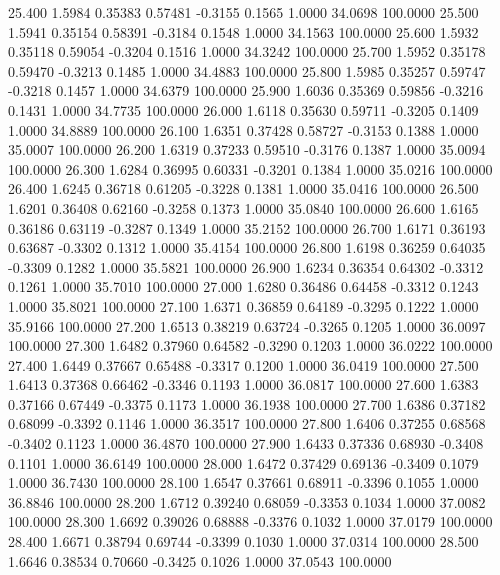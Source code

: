  25.400   1.5984   0.35383   0.57481  -0.3155   0.1565   1.0000  34.0698 100.0000
  25.500   1.5941   0.35154   0.58391  -0.3184   0.1548   1.0000  34.1563 100.0000
  25.600   1.5932   0.35118   0.59054  -0.3204   0.1516   1.0000  34.3242 100.0000
  25.700   1.5952   0.35178   0.59470  -0.3213   0.1485   1.0000  34.4883 100.0000
  25.800   1.5985   0.35257   0.59747  -0.3218   0.1457   1.0000  34.6379 100.0000
  25.900   1.6036   0.35369   0.59856  -0.3216   0.1431   1.0000  34.7735 100.0000
  26.000   1.6118   0.35630   0.59711  -0.3205   0.1409   1.0000  34.8889 100.0000
  26.100   1.6351   0.37428   0.58727  -0.3153   0.1388   1.0000  35.0007 100.0000
  26.200   1.6319   0.37233   0.59510  -0.3176   0.1387   1.0000  35.0094 100.0000
  26.300   1.6284   0.36995   0.60331  -0.3201   0.1384   1.0000  35.0216 100.0000
  26.400   1.6245   0.36718   0.61205  -0.3228   0.1381   1.0000  35.0416 100.0000
  26.500   1.6201   0.36408   0.62160  -0.3258   0.1373   1.0000  35.0840 100.0000
  26.600   1.6165   0.36186   0.63119  -0.3287   0.1349   1.0000  35.2152 100.0000
  26.700   1.6171   0.36193   0.63687  -0.3302   0.1312   1.0000  35.4154 100.0000
  26.800   1.6198   0.36259   0.64035  -0.3309   0.1282   1.0000  35.5821 100.0000
  26.900   1.6234   0.36354   0.64302  -0.3312   0.1261   1.0000  35.7010 100.0000
  27.000   1.6280   0.36486   0.64458  -0.3312   0.1243   1.0000  35.8021 100.0000
  27.100   1.6371   0.36859   0.64189  -0.3295   0.1222   1.0000  35.9166 100.0000
  27.200   1.6513   0.38219   0.63724  -0.3265   0.1205   1.0000  36.0097 100.0000
  27.300   1.6482   0.37960   0.64582  -0.3290   0.1203   1.0000  36.0222 100.0000
  27.400   1.6449   0.37667   0.65488  -0.3317   0.1200   1.0000  36.0419 100.0000
  27.500   1.6413   0.37368   0.66462  -0.3346   0.1193   1.0000  36.0817 100.0000
  27.600   1.6383   0.37166   0.67449  -0.3375   0.1173   1.0000  36.1938 100.0000
  27.700   1.6386   0.37182   0.68099  -0.3392   0.1146   1.0000  36.3517 100.0000
  27.800   1.6406   0.37255   0.68568  -0.3402   0.1123   1.0000  36.4870 100.0000
  27.900   1.6433   0.37336   0.68930  -0.3408   0.1101   1.0000  36.6149 100.0000
  28.000   1.6472   0.37429   0.69136  -0.3409   0.1079   1.0000  36.7430 100.0000
  28.100   1.6547   0.37661   0.68911  -0.3396   0.1055   1.0000  36.8846 100.0000
  28.200   1.6712   0.39240   0.68059  -0.3353   0.1034   1.0000  37.0082 100.0000
  28.300   1.6692   0.39026   0.68888  -0.3376   0.1032   1.0000  37.0179 100.0000
  28.400   1.6671   0.38794   0.69744  -0.3399   0.1030   1.0000  37.0314 100.0000
  28.500   1.6646   0.38534   0.70660  -0.3425   0.1026   1.0000  37.0543 100.0000
